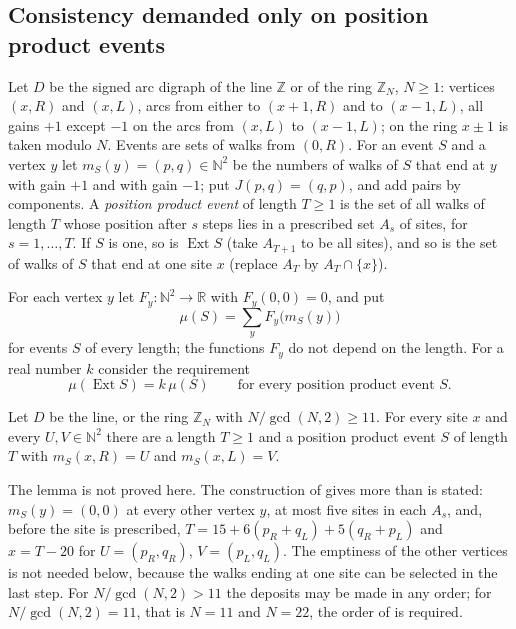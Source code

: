
\subsection{Consistency demanded only on position product events}

Let $D$ be the signed arc digraph of the line $\mathbb{Z}$ or of the ring $\mathbb{Z}_N$, $N\ge1$: vertices $(x,R)$ and $(x,L)$, arcs from either to $(x+1,R)$ and to $(x-1,L)$, all gains $+1$ except $-1$ on the arcs from $(x,L)$ to $(x-1,L)$; on the ring $x\pm1$ is taken modulo $N$. Events are sets of walks from $(0,R)$. For an event $S$ and a vertex $y$ let $m_S(y)=(p,q)\in\mathbb{N}^2$ be the numbers of walks of $S$ that end at $y$ with gain $+1$ and with gain $-1$; put $J(p,q)=(q,p)$, and add pairs by components. A \emph{position product event} of length $T\ge1$ is the set of all walks of length $T$ whose position after $s$ steps lies in a prescribed set $A_s$ of sites, for $s=1,\dots,T$. If $S$ is one, so is $\operatorname{Ext}S$ (take $A_{T+1}$ to be all sites), and so is the set of walks of $S$ that end at one site $x$ (replace $A_T$ by $A_T\cap\{x\}$).

For each vertex $y$ let $F_y\colon\mathbb{N}^2\to\mathbb{R}$ with $F_y(0,0)=0$, and put
\begin{equation}\label{eq:multirule}
\mu(S)=\sum_{y}F_y\bigl(m_S(y)\bigr)
\end{equation}
for events $S$ of every length; the functions $F_y$ do not depend on the length. For a real number $k$ consider the requirement
\begin{equation}\label{eq:ppcons}
\mu(\operatorname{Ext}S)=k\,\mu(S)\qquad\text{for every position product event }S .
\end{equation}

\begin{lemma}\label{lem:prep}
Let $D$ be the line, or the ring $\mathbb{Z}_N$ with $N/\gcd(N,2)\ge11$. For every site $x$ and every $U,V\in\mathbb{N}^2$ there are a length $T\ge1$ and a position product event $S$ of length $T$ with $m_S(x,R)=U$ and $m_S(x,L)=V$.
\end{lemma}

The lemma is not proved here. The construction of \cite{dgmask} gives more than is stated: $m_S(y)=(0,0)$ at every other vertex $y$, at most five sites in each $A_s$, and, before the site is prescribed, $T=15+6(p_R+q_L)+5(q_R+p_L)$ and $x=T-20$ for $U=(p_R,q_R)$, $V=(p_L,q_L)$. The emptiness of the other vertices is not needed below, because the walks ending at one site can be selected in the last step. For $N/\gcd(N,2)>11$ the deposits may be made in any order; for $N/\gcd(N,2)=11$, that is $N=11$ and $N=22$, the order of \cite{dgmask} is required.


